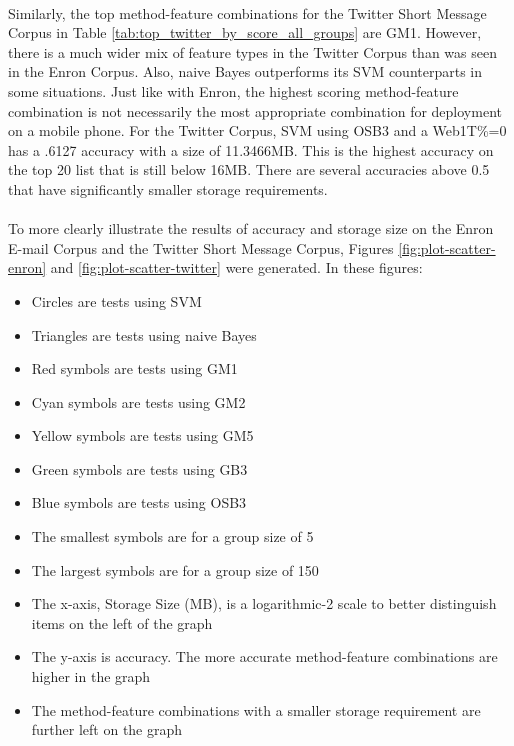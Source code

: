 \paragraph*{} Similarly, the top method-feature combinations for the Twitter Short Message Corpus in Table \ref{tab:top_twitter_by_score_all_groups} are GM1.  However, there is a much wider mix of feature types in the Twitter Corpus than was seen in the Enron Corpus.  Also, naive Bayes outperforms its SVM counterparts in some situations.  Just like with Enron, the highest scoring method-feature combination is not necessarily the most appropriate combination for deployment on a mobile phone.  For the Twitter Corpus, SVM using OSB3 and a Web1T\%=0 has a .6127 accuracy with a size of 11.3466MB.  This is the highest accuracy on the top 20 list that is still below 16MB.  There are several accuracies above 0.5 that have significantly smaller storage requirements.

\paragraph*{} To more clearly illustrate the results of accuracy and storage size on the Enron E-mail Corpus and the Twitter Short Message Corpus, Figures \ref{fig:plot-scatter-enron} and \ref{fig:plot-scatter-twitter} were generated.  In these figures:
	\begin{itemize}
		\item Circles are tests using SVM
		\item Triangles are tests using naive Bayes
		\item Red symbols are tests using GM1
		\item Cyan symbols are tests using GM2
		\item Yellow symbols are tests using GM5
		\item Green symbols are tests using GB3
		\item Blue symbols are tests using OSB3
		\item The smallest symbols are for a group size of 5
		\item The largest symbols are for a group size of 150
		\item The x-axis, Storage Size (MB), is a logarithmic-2 scale to better distinguish items on the left of the graph
		\item The y-axis is accuracy. The more accurate method-feature combinations are higher in the graph
		\item The method-feature combinations with a smaller storage requirement are further left on the graph
	\end{itemize}
		
